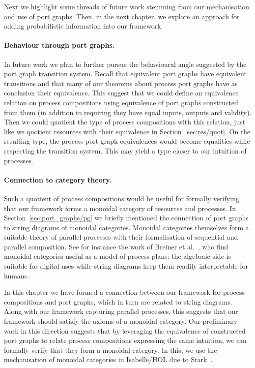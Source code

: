 \documentclass[class=smolathesis,crop=false]{standalone}
\begin{document}
Next we highlight some threads of future work stemming from our mechanisation and use of port graphs.
Then, in the next chapter, we explore an approach for adding probabilistic information into our framework.

\paragraph*{Behaviour through port graphs.}
In future work we plan to further pursue the behavioural angle suggested by the port graph transition system.
Recall that equivalent port graphs have equivalent transitions and that many of our theorems about process port graphs have as conclusion their equivalence.
This suggest that we could define an equivalence relation on process compositions using equivalence of port graphs constructed from them (in addition to requiring they have equal inputs, outputs and validity).
Then we could quotient the type of process compositions with this relation, just like we quotient resources with their equivalence in Section~\ref{sec:res/quot}.
On the resulting type, the process port graph equivalences would become equalities while respecting the transition system.
This may yield a type closer to our intuition of processes.

\paragraph*{Connection to category theory.}
Such a quotient of process compositions would be useful for formally verifying that our framework forms a monoidal category of resources and processes.
In Section~\ref{sec:port_graphs/pg} we briefly mentioned the connection of port graphs to string diagrams of monoidal categories.
Monoidal categories themselves form a suitable theory of parallel processes with their formalisation of sequential and parallel composition.
See for instance the work of Breiner et al.~\cite{breiner_et_al-2019}, who find monoidal categories useful as a model of process plans: the algebraic side is suitable for digital uses while string diagrams keep them readily interpretable for humans.

In this chapter we have formed a connection between our framework for process compositions and port graphs, which in turn are related to string diagrams.
Along with our framework capturing parallel processes, this suggests that our framework should satisfy the axioms of a monoidal category.
Our preliminary work in this direction suggests that by leveraging the equivalence of constructed port graphs to relate process compositions expressing the same intuition, we can formally verify that they form a monoidal category.
In this, we use the mechanisation of monoidal categories in Isabelle/HOL due to Stark~\cite{MonoidalCategory-AFP}.
\end{document}
